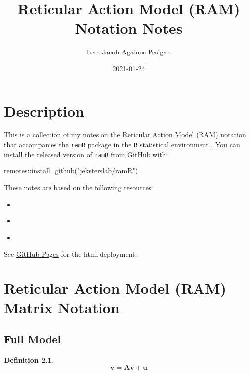 \documentclass[
]{book}
\title{Reticular Action Model (RAM) Notation Notes}
\author{Ivan Jacob Agaloos Pesigan}
\date{2021-01-24}
\newenvironment{Shaded}{\begin{snugshade}}{\end{snugshade}}
\newcommand{\FunctionTok}[1]{\textcolor[rgb]{0.00,0.00,0.00}{#1}}
\newcommand{\NormalTok}[1]{#1}
\newcommand{\SpecialCharTok}[1]{\textcolor[rgb]{0.00,0.00,0.00}{#1}}
\newcommand{\StringTok}[1]{\textcolor[rgb]{0.31,0.60,0.02}{#1}}
\providecommand{\tightlist}{%
  \setlength{\itemsep}{0pt}\setlength{\parskip}{0pt}}
\theoremstyle{definition}
\newtheorem{definition}{Definition}[chapter]
\theoremstyle{definition}
\theoremstyle{definition}
\theoremstyle{remark}
\begin{document}
\maketitle

{
\setcounter{tocdepth}{1}
\tableofcontents
}
\hypertarget{description}{%
\chapter{Description}\label{description}}

This is a collection of my notes
on the Reticular Action Model (RAM) notation
that accompanies the \texttt{ramR} package \citep{R-ramR}
in the \texttt{R} statistical environment \citep{R-base}.
You can install the released version of \texttt{ramR}
from \href{https://github.com/jeksterslab/ramR}{GitHub} with:

\begin{Shaded}
\begin{Highlighting}[]
\NormalTok{remotes}\SpecialCharTok{::}\FunctionTok{install\_github}\NormalTok{(}\StringTok{"jeksterslab/ramR"}\NormalTok{)}
\end{Highlighting}
\end{Shaded}

These notes are based on the following resources:

\begin{itemize}
\tightlist
\item
  \citet{Boker-2005}
\item
  \citet{McArdle-1984}
\item
  \citet{McArdle-2005}
\end{itemize}

See \href{https://jeksterslab.github.io/ramR_notes/index.html}{GitHub Pages}
for the html deployment.

\hypertarget{ram-matrix-notation}{%
\chapter{Reticular Action Model (RAM) Matrix Notation}\label{ram-matrix-notation}}

\hypertarget{full-model}{%
\section{Full Model}\label{full-model}}

\begin{definition}
\protect\hypertarget{def:unnamed-chunk-2}{}{\label{def:unnamed-chunk-2} }\begin{equation}
  \mathbf{v}
  =
  \mathbf{A} \mathbf{v} + \mathbf{u}
\end{equation}
\end{definition}
\end{document}
